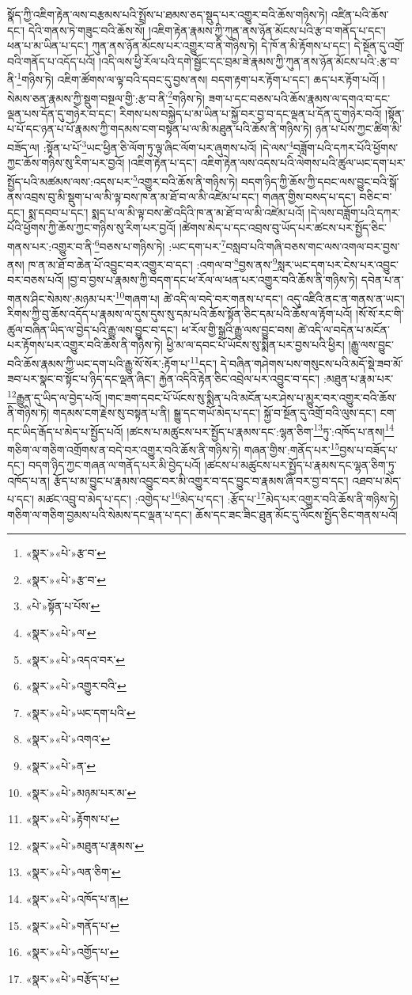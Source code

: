 སྣོད་ཀྱི་འཇིག་རྟེན་ལས་བརྩམས་པའི་སྤྲོས་པ་ཐམས་ཅད་སྡུད་པར་འགྱུར་བའི་ཆོས་གཉིས་ཏེ། འཛིན་པའི་ཆོས་དང་། དེའི་གནས་ཏེ་གཟུང་བའི་ཆོས་སོ། །འཇིག་རྟེན་རྣམས་ཀྱི་ཀུན་ནས་ཉོན་མོངས་པའི་རྩ་བ་གནོད་པ་དང་། ཕན་པ་མ་ཡིན་པ་དང་། ཀུན་ནས་ཉོན་མོངས་པར་འགྱུར་བ་ནི་གཉིས་ཏེ། དེ་ཁོ་ན་མི་རྟོགས་པ་དང་། དེ་སྔོན་དུ་འགྲོ་བའི་གནོད་པ་འདོད་པའོ། །འདི་ལས་ཕྱི་རོལ་པའི་དགེ་སྦྱོང་དང་བྲམ་ཟེ་རྣམས་ཀྱི་ཀུན་ནས་ཉོན་མོངས་པའི་:རྩ་བ་ནི་\footnote{«སྣར་»«པེ་»རྩ་བ་}གཉིས་ཏེ། འཇིག་ཚོགས་ལ་ལྟ་བའི་དབང་དུ་བྱས་ནས། བདག་རྟག་པར་རྟོག་པ་དང་། ཆད་པར་རྟོག་པའོ། །སེམས་ཅན་རྣམས་ཀྱི་སྡུག་བསྔལ་གྱི་:རྩ་བ་ནི་\footnote{«སྣར་»«པེ་»རྩ་བ་}གཉིས་ཏེ། ཟག་པ་དང་བཅས་པའི་ཆོས་རྣམས་ལ་དགའ་བ་དང་ལྡན་པས་དོན་དུ་གཉེར་བ་དང་། རིགས་པས་བསྐྱེད་པ་མ་ཡིན་པ་སྐྱོ་བར་བྱ་བ་དང་ལྡན་པ་དོན་དུ་གཉེར་བའོ། །སྟོན་པ་པོ་དང་ཉན་པ་པོ་རྣམས་ཀྱི་གདམས་ངག་བསྟན་པ་ལ་མི་མཐུན་པའི་ཆོས་ནི་གཉིས་ཏེ། ཉན་པ་པོས་ཀྱང་ཚིག་མི་བཟོད་ལ། :སྟོན་པ་པོ་\footnote{«པེ་»སྟོན་པ་པོས་}ཡང་ཕྱིན་ཅི་ལོག་ཏུ་ལྟ་ཞིང་ལོག་པར་ཞུགས་པའོ། །དེ་ལས་\footnote{«སྣར་»«པེ་»ལ་}བཟློག་པའི་དཀར་པོའི་ཕྱོགས་ཀྱང་ཆོས་གཉིས་སུ་རིག་པར་བྱའོ། །འཇིག་རྟེན་པ་དང་། འཇིག་རྟེན་ལས་འདས་པའི་ལེགས་པའི་ཚུལ་ཡང་དག་པར་སྤྱོད་པའི་མཚམས་ལས་:འདས་པར་\footnote{«སྣར་»«པེ་»འདའ་བར་}འགྱུར་བའི་ཆོས་ནི་གཉིས་ཏེ། བདག་ཉིད་ཀྱི་ཆོས་ཀྱི་དབང་ལས་བྱུང་བའི་སྒོ་ནས་འབྲས་བུ་མི་སྡུག་པ་ལ་མི་ལྟ་བས་ཁ་ན་མ་ཐོ་བ་ལ་མི་འཛེམ་པ་དང་། གཞན་གྱིས་བསད་པ་དང་། བཅིང་བ་དང་། སྨ་དབབ་པ་དང་། སྨད་པ་ལ་མི་ལྟ་བས་ཚེ་འདིའི་ཁ་ན་མ་ཐོ་བ་ལ་མི་འཛེམ་པའོ། །དེ་ལས་བཟློག་པའི་དཀར་པོའི་ཕྱོགས་ཀྱི་ཆོས་ཀྱང་གཉིས་སུ་རིག་པར་བྱའོ། །ཚེགས་མེད་པ་དང་འབྲས་བུ་ཡོད་པར་ཚངས་པར་སྤྱོད་ཅིང་གནས་པར་:འགྱུར་བ་ནི་\footnote{«སྣར་»«པེ་»འགྱུར་བའི་}བཅས་པ་གཉིས་ཏེ། :ཡང་དག་པར་\footnote{«སྣར་»«པེ་»ཡང་དག་པའི་}བསླབ་པའི་གཞི་བཅས་གང་ལས་འགལ་བར་བྱས་ནས། ཁ་ན་མ་ཐོ་བ་ཆེན་པོ་འབྱུང་བར་འགྱུར་བ་དང་། :འགལ་བ་\footnote{«སྣར་»«པེ་»འགའ་}བྱས་ནས་\footnote{«སྣར་»«པེ་»ན་}སླར་ཡང་དག་པར་ངེས་པར་འབྱུང་བར་བཅས་པའོ། །བྱ་བ་བྱས་པ་རྣམས་ཀྱི་བདག་དང་ཕ་རོལ་ལ་ཕན་པར་འགྱུར་བའི་ཆོས་ནི་གཉིས་ཏེ། དབེན་པ་ན་གནས་ཤིང་སེམས་:མཉམ་པར་\footnote{«སྣར་»«པེ་»མཉམ་པར་མ་}གཞག་པ། ཚེ་འདི་ལ་བདེ་བར་གནས་པ་དང་། འདུ་འཛིའི་ནང་ན་གནས་ན་ཡང་། རིགས་ཀྱི་བུ་ཆོས་འདོད་པ་རྣམས་ལ་དུས་དུས་སུ་དམ་པའི་ཆོས་སྟོན་ཅིང་དམ་པའི་ཆོས་ལ་རྟོག་པའོ། །སོ་སོ་རང་གི་ཚུལ་བཞིན་ཡིད་ལ་བྱེད་པའི་རྒྱུ་ལས་བྱུང་བ་དང་། ཕ་རོལ་གྱི་སྒྲའི་རྒྱུ་ལས་བྱུང་བས། ཚེ་འདི་ལ་བདེན་པ་མངོན་པར་རྟོགས་པར་འགྱུར་བའི་ཆོས་ནི་གཉིས་ཏེ། ཕྱི་མ་ལ་དབང་པོ་ཡོངས་སུ་སྨིན་པར་བྱས་པའི་ཕྱིར། །རྒྱུ་ལས་བྱུང་བའི་ཆོས་རྣམས་ཀྱི་ཡང་དག་པའི་རྒྱུ་སོ་སོར་:རྟོག་པ་\footnote{«སྣར་»«པེ་»རྟོགས་པ་}དང་། དེ་བཞིན་གཤེགས་པས་གསུངས་པའི་མདོ་སྡེ་ཟབ་མོ་ཟབ་པར་སྣང་བ་སྟོང་པ་ཉིད་དང་ལྡན་ཞིང་། རྐྱེན་འདིའི་རྟེན་ཅིང་འབྲེལ་པར་འབྱུང་བ་དང་། :མཐུན་པ་རྣམ་པར་\footnote{«སྣར་»«པེ་»མཐུན་པ་རྣམས་}རྒྱུན་དུ་ཡིད་ལ་བྱེད་པའོ། །གང་ཟག་དབང་པོ་ཡོངས་སུ་སྨིན་པའི་མངོན་པར་ཤེས་པ་མྱུར་བར་འགྱུར་བའི་ཆོས་ནི་གཉིས་ཏེ། གདམས་ངག་རྗེས་སུ་བསྟན་པ་ནི། སྒྱུ་དང་གཡོ་མེད་པ་དང་། སྐྱོ་བ་སྔོན་དུ་འགྲོ་བའི་ལུས་དང་། ངག་དང་ཡིད་རྒོད་པ་མེད་པ་སྤྱོད་པའོ། །ཚངས་པ་མཚུངས་པར་སྤྱོད་པ་རྣམས་དང་:ལྷན་ཅིག་\footnote{«སྣར་»«པེ་»ལན་ཅིག་}ཏུ་:འཁོད་པ་ནས།\footnote{«སྣར་»«པེ་»འཁོད་པ་ན།} གཅིག་ལ་གཅིག་འགྲོགས་ན་བདེ་བར་འགྱུར་བའི་ཆོས་ནི་གཉིས་ཏེ། གཞན་གྱིས་:གནོད་པར་\footnote{«སྣར་»«པེ་»གནོད་པ་}བྱས་པ་བཟོད་པ་དང་། བདག་ཉིད་ཀྱང་གཞན་ལ་གནོད་པར་མི་བྱེད་པའོ། །ཚངས་པ་མཚུངས་པར་སྤྱོད་པ་རྣམས་དང་ལྷན་ཅིག་ཏུ་འཁོད་པ་ན། རྩོད་པ་མ་བྱུང་པ་རྣམས་འབྱུང་བར་མི་འགྱུར་བ་དང་བྱུང་བ་རྣམས་ཞི་བར་བྱ་བ་དང་། འཐབ་པ་མེད་པ་དང་། མཚང་འབྲུ་བ་མེད་པ་དང་། :འགྱེད་པ་\footnote{«སྣར་»«པེ་»འགྱོད་པ་}མེད་པ་དང་། :རྩོད་པ་\footnote{«སྣར་»«པེ་»བརྩོད་པ་}མེད་པར་འགྱུར་བའི་ཆོས་ནི་གཉིས་ཏེ། གཅིག་ལ་གཅིག་བྱམས་པའི་སེམས་དང་ལྡན་པ་དང་། ཆོས་དང་ཟང་ཟིང་ཐུན་མོང་དུ་ལོངས་སྤྱོད་ཅིང་གནས་པའོ། 